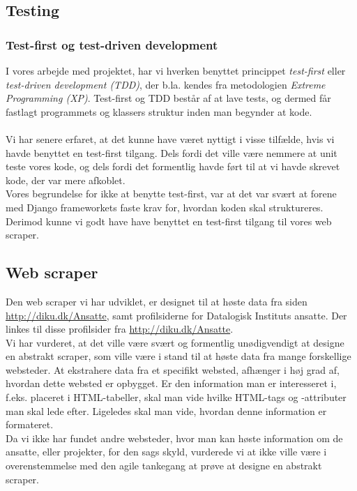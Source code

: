\documentclass[12pt]{article}
\begin{document}
\subsection{Testing}
\subsubsection{Test-first og test-driven development}
I vores arbejde med projektet, har vi hverken benyttet princippet \textit{test-first} eller \textit{test-driven development (TDD)}, der b.la. kendes fra metodologien \textit{Extreme Programming (XP)}. Test-first og TDD består af at lave tests, og dermed får fastlagt programmets og klassers struktur inden man begynder at kode.\\
\\
Vi har senere erfaret, at det kunne have været nyttigt i visse tilfælde, hvis vi havde benyttet en test-first tilgang. Dels fordi det ville være nemmere at unit teste vores kode, og dels fordi det formentlig havde ført til at vi havde skrevet kode, der var mere afkoblet. \\
Vores begrundelse for ikke at benytte test-first, var at det var svært at forene med Django frameworkets faste krav for, hvordan koden skal struktureres. \\
Derimod kunne vi godt have have benyttet en test-first tilgang til vores web scraper.

\subsection{Web scraper}
Den web scraper vi har udviklet, er designet til at høste data fra siden \url{http://diku.dk/Ansatte}, samt profilsiderne for Datalogisk Instituts ansatte. Der linkes til disse profilsider fra \url{http://diku.dk/Ansatte}.\\
Vi har vurderet, at det ville være svært og formentlig unødigvendigt at designe en abstrakt scraper, som ville være i stand til at høste data fra mange forskellige websteder. At ekstrahere data fra et specifikt websted, afhænger i høj grad af, hvordan dette websted er opbygget. Er den information man er interesseret i, f.eks. placeret i  HTML-tabeller, skal man vide hvilke HTML-tags og -attributer man skal lede efter. Ligeledes skal man vide, hvordan denne information er formateret. \\
Da vi ikke har fundet andre websteder, hvor man kan høste information om de ansatte, eller projekter, for den sags skyld, vurderede vi at ikke ville være i overenstemmelse med den agile tankegang at prøve at designe en abstrakt scraper.
\end{document}
